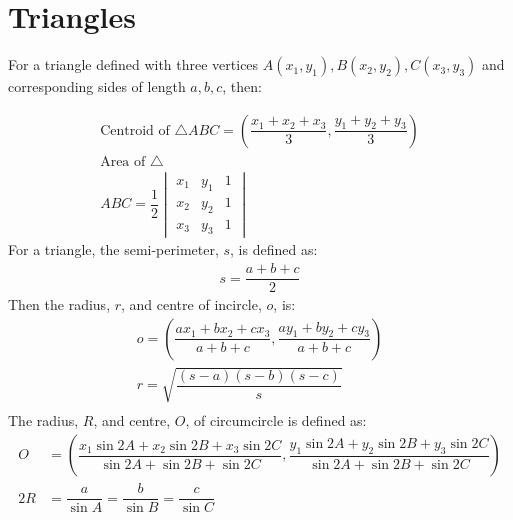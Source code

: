 \documentclass[../main.tex]{subfile}
\begin{document}
	\chapter{Triangles}
	For a triangle defined with three vertices $A(x_1,y_1),B(x_2,y_2),C(x_3,y_3)$ and corresponding sides of length $a,b,c$, then:
	
	\begin{align}
		\text{Centroid of }\triangle ABC=(\dfrac{x_1+x_2+x_3}{3},\dfrac{y_1+y_2+y_3}{3})\\
		\text{Area of }\triangle \\ ABC=\dfrac{1}{2}\begin{vmatrix}x_1&y_1&1\\x_2&y_2&1\\x_3&y_3&1\end{vmatrix}
	\end{align}
	For a triangle, the semi-perimeter, $s$, is defined as:
	\begin{align}
	s=\dfrac{a+b+c}{2}\nonumber
	\end{align}
	Then the radius, $r$, and centre of incircle, $o$, is:
	\begin{align}
		o=\left(\dfrac{ax_1+bx_2+cx_3}{a+b+c},\dfrac{ay_1+by_2+cy_3}{a+b+c}\right)\\
		r=\sqrt{\dfrac{(s-a)(s-b)(s-c)}{s}}\\
	\end{align}
	The radius, $R$, and centre, $O$, of circumcircle is defined as:
	\begin{align}
		O & = \left( \dfrac{x_1 \sin 2A + x_2 \sin 2B + x_3 \sin 2C}{\sin 2A + \sin 2B + \sin 2C}, \dfrac{y_1 \sin 2A + y_2 \sin 2B + y_3 \sin 2C}{\sin 2A + \sin 2B + \sin 2C} \right)\\
		2R & = \dfrac{a}{\sin A} = \dfrac{b}{\sin B} = \dfrac{c}{\sin C}
	\end{align}
\end{document}
